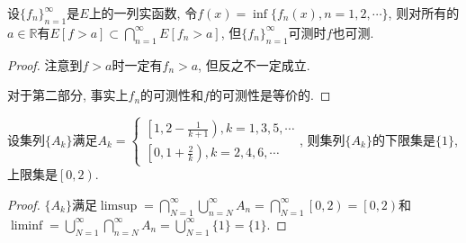 \documentclass[theorem=false,mathfont=none,openany,sub3section]{easybook}
\begin{document}
\begin{example}
  设$\{f_n\}_{n=1}^{\infty}$是$E$上的一列实函数, 令$f(x) = \inf \{f_n(x), n = 1, 2, \cdots\}$, 则对所有的$a\in \mathbb{R}$有$E[f > a] \subset \bigcap_{n=1}^{\infty}E[f_n > a]$, 但$\{f_n\}_{n=1}^{\infty}$可测时$f$也可测.
\end{example}

\begin{proof}
  注意到$f>a$时一定有$f_n>a$, 但反之不一定成立.\par
  对于第二部分, 事实上$f_n$的可测性和$f$的可测性是等价的.\par
\end{proof}

\begin{example}
  设集列$\{A_k\}$满足$A_k=\begin{cases}
    \left[1,2-\frac{1}{k+1}\right), k =1,3,5,\cdots\\
    \left[0,1+\frac{2}{k}\right), k=2,4,6,\cdots
  \end{cases}$, 则集列$\{A_k\}$的下限集是$\{1\}$, 上限集是$\left[0\right.,\left. 2\right)$.
\end{example}

\begin{proof}
  $\{A_k\}$满足$\limsup = \bigcap_{N=1}^{\infty} \bigcup_{n=N}^{\infty}A_n= \bigcap_{N=1}^{\infty} \left[0,2\right)=\left[0,2\right)$和$\liminf = \bigcup_{N=1}^{\infty} \bigcap_{n=N}^{\infty}A_n= \bigcup_{N=1}^{\infty} \{1\}=\{1\}$.\par
\end{proof}

\backmatter
\end{document}
